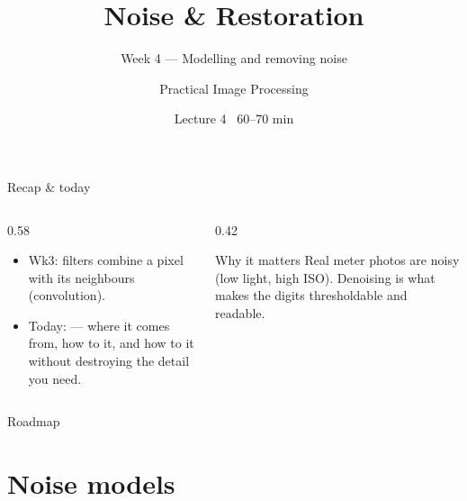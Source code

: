 \documentclass[10pt,aspectratio=169]{beamer}
\title{Noise \& Restoration}
\subtitle{Week 4 — Modelling and removing noise}
\author{Practical Image Processing}
\date{Lecture 4 \textbullet\ 60--70 min}
\begin{document}
\maketitle

\begin{frame}{Recap \& today}
  \begin{columns}[T]
    \begin{column}{0.58\textwidth}
      \begin{itemize}
        \item Wk3: filters combine a pixel with its neighbours (convolution).
        \item \alert{Today:}  — where it comes from, how to  it, and how
              to  it without destroying the detail you need.
      \end{itemize}
    \end{column}
    \begin{column}{0.42\textwidth}
      \begin{alertblock}{Why it matters}
        Real meter photos are noisy (low light, high ISO). Denoising is what makes the digits
        thresholdable and readable.
      \end{alertblock}
    \end{column}
  \end{columns}
\end{frame}

\begin{frame}{Roadmap}\tableofcontents\end{frame}

\section{Noise models}
\end{document}
